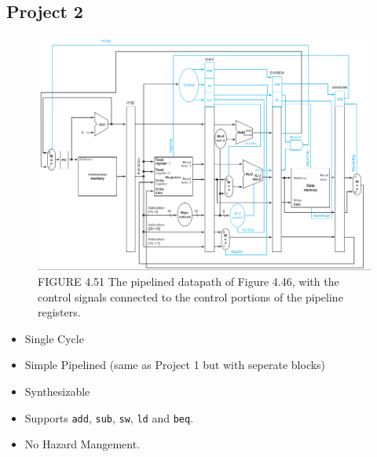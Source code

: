 \documentclass{article}
\begin{document}
\subsection*{Project 2}
\begin{figure}[H]
    \begin{center}
        \includegraphics[scale=0.5]{PipelinedImplementation1/Implementation1_pro2.png}
        \caption*{FIGURE 4.51 The pipelined datapath of Figure 4.46, with the control signals connected to the control portions of the pipeline registers.}
    \end{center}
\end{figure}

\begin{itemize}
    \item Single Cycle
    \item Simple Pipelined (same as Project 1 but with seperate blocks)
    \item Synthesizable
    \item Supports \verb|add|, \verb|sub|, \verb|sw|, \verb|ld| and \verb|beq|.
    \item No Hazard Mangement.
\end{itemize}
\end{document}
